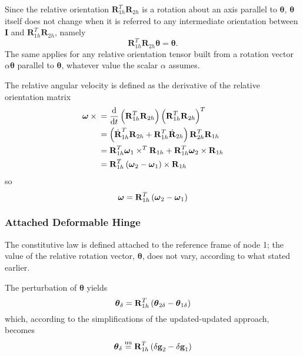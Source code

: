 \documentclass[10pt,dvips,fleqn,subeqn]{report}
\newcommand{\T}[1]{\bm{\mathbf{#1}}}
\newcommand{\equu}{\overset{\text{uu}}{=}}
\begin{document}
Since the relative orientation $\T{R}_{1h}^T \T{R}_{2h}$ is a rotation 
about an axis parallel to $\T{\theta}$, $\T{\theta}$ itself
does not change when it is referred to any intermediate orientation
between $\T{I}$ and $\T{R}_{1h}^T \T{R}_{2h}$, namely
\begin{equation}
	\T{R}_{1h}^T \T{R}_{2h}\T{\theta} = \T{\theta} .
\end{equation}
The same applies for any relative orientation tensor built from a rotation
vector $\alpha\T{\theta}$ parallel to $\T{\theta}$, whatever value 
the scalar $\alpha$ assumes.

The relative angular velocity is defined as the derivative
of the relative orientation matrix
\begin{align}
	\T{\omega}\times{}
	&= \frac{\mathrm{d}}{\mathrm{d}t} \plbr{
		\T{R}_{1h}^T \T{R}_{2h}
	} \plbr{
		\T{R}_{1h}^T \T{R}_{2h}
	}^T \nonumber \\
	&= \plbr{
		\dot{\T{R}}_{1h}^T \T{R}_{2h}
		+ \T{R}_{1h}^T \dot{\T{R}}_{2h}
	} \T{R}_{2h}^T \T{R}_{1h} \nonumber \\
	&= \T{R}_{1h}^T \T{\omega}_1 \times^T \T{R}_{1h}
	+ \T{R}_{1h}^T \T{\omega}_2 \times \T{R}_{1h} \nonumber \\
	&= \T{R}_{1h}^T \plbr{
		\T{\omega}_2 - \T{\omega}_1
	}\times \T{R}_{1h}
\end{align}
so
\begin{equation}
	\T{\omega} = \T{R}_{1h}^T \plbr{
		\T{\omega}_2 - \T{\omega}_1
	}
	\label{eq:deformable-hinge-attached-omega}
\end{equation}



\subsubsection{Attached Deformable Hinge}
The constitutive law is defined attached to the reference frame of node 1;
the value of the relative rotation vector, $\T{\theta}$, does not vary,
according to what stated earlier.

The perturbation of $\T{\theta}$ yields
\begin{equation}
	\T{\theta}_{\delta} = \T{R}_{1h}^T\plbr{\T{\theta}_{2\delta} - \T{\theta}_{1\delta}}
	\label{eq:def-h-theta-delta}
\end{equation}
which, according to the simplifications of the updated-updated approach, becomes
\begin{equation}
	\T{\theta}_{\delta} \equu \T{R}_{1h}^T\plbr{\delta\T{g}_2 - \delta\T{g}_1}
\end{equation}
\end{document}
